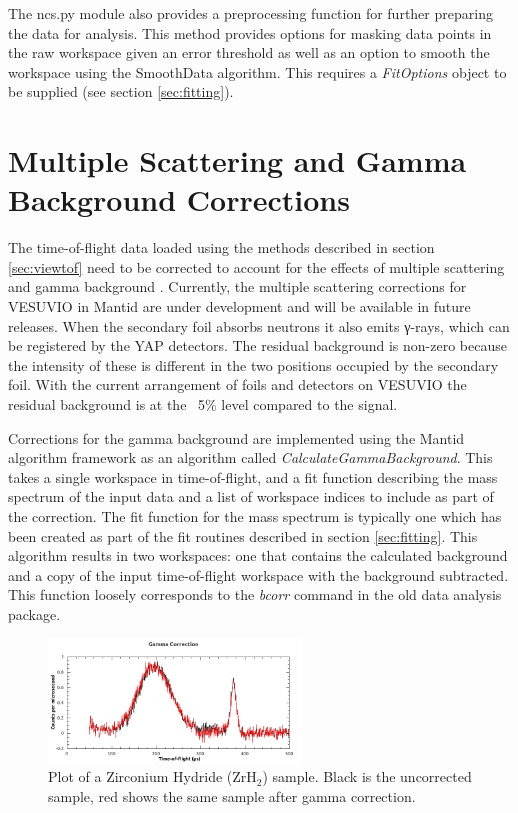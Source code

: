 \documentclass[paper=a4, fontsize=11pt]{scrartcl}	%
\numberwithin{equation}{section}															%
\numberwithin{figure}{section}																%
\numberwithin{table}{section}
\begin{document}
The ncs.py module also provides a preprocessing function for further preparing the data for analysis. This method provides options for masking data points in the raw workspace given an error threshold as well as an option to smooth the workspace using the SmoothData algorithm. This requires a \textit{FitOptions} object to be supplied (see section \ref{sec:fitting}).

\section{Multiple Scattering and Gamma Background Corrections}
\label{sec:corrections}
The time-of-flight data loaded using the methods described in section \ref{sec:viewtof} need to be corrected to account for the effects of multiple scattering \citep{mayers2002multiple} and gamma background \citep{mayers2011calculation}. Currently, the multiple scattering corrections for VESUVIO in Mantid are under development and will be available in future releases. When the secondary foil absorbs neutrons it also emits γ-rays, which can be registered by the YAP detectors. The residual background is non-zero because the intensity of these is different in the two positions occupied by the secondary foil. With the current arrangement of foils and detectors on VESUVIO the residual background is at the ~5\% level compared to the signal.

Corrections for the gamma background are implemented using the Mantid algorithm framework as an algorithm called \textit{CalculateGammaBackground}. This takes a single workspace in time-of-flight, and a fit function describing the mass spectrum of the input data and a list of workspace indices to include as part of the correction. The fit function for the mass spectrum is typically one which has been created as part of the fit routines described in section \ref{sec:fitting}. This algorithm results in two workspaces: one that contains the calculated background and a copy of the input time-of-flight workspace with the background subtracted. This function loosely corresponds to the \textit{bcorr} command in the old data analysis package.

\begin{figure}[H]
\centering
\includegraphics[width=0.6\textwidth]{img/corrections-gamma.png}
\caption{Plot of a Zirconium Hydride (ZrH$_2$) sample. Black is the uncorrected sample, red shows the same sample after gamma correction.}
\label{fig:corrections-gamma}
\end{figure}
\end{document}
